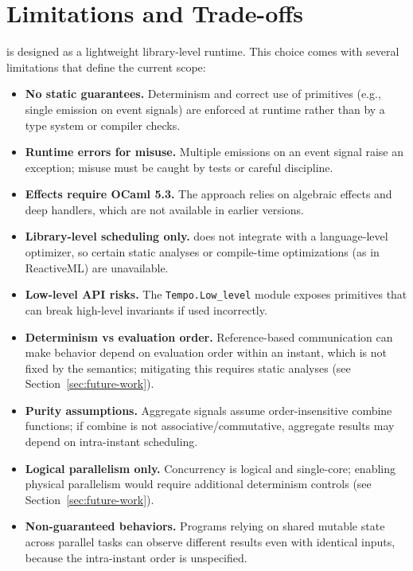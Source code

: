 \section{Limitations and Trade-offs}
\tempo{} is designed as a lightweight library-level runtime. This choice comes
with several limitations that define the current scope:
\begin{itemize}
\item \textbf{No static guarantees.} Determinism and correct use of primitives
  (e.g., single emission on event signals) are enforced at runtime rather than
  by a type system or compiler checks.
\item \textbf{Runtime errors for misuse.} Multiple emissions on an event signal
  raise an exception; misuse must be caught by tests or careful discipline.
\item \textbf{Effects require OCaml 5.3.} The approach relies on algebraic
  effects and deep handlers, which are not available in earlier versions.
\item \textbf{Library-level scheduling only.} \tempo{} does not integrate with a
  language-level optimizer, so certain static analyses or compile-time
  optimizations (as in ReactiveML) are unavailable.
\item \textbf{Low-level API risks.} The \texttt{Tempo.Low\_level} module exposes
  primitives that can break high-level invariants if used incorrectly.
\item \textbf{Determinism vs evaluation order.} Reference-based communication
  can make behavior depend on evaluation order within an instant, which is not
  fixed by the semantics; mitigating this requires static analyses (see
  Section~\ref{sec:future-work}).
\item \textbf{Purity assumptions.} Aggregate signals assume order-insensitive
  combine functions; if combine is not associative/commutative, aggregate
  results may depend on intra-instant scheduling.
\item \textbf{Logical parallelism only.} Concurrency is logical and single-core;
  enabling physical parallelism would require additional determinism controls
  (see Section~\ref{sec:future-work}).
\item \textbf{Non-guaranteed behaviors.} Programs relying on shared mutable
  state across parallel tasks can observe different results even with identical
  inputs, because the intra-instant order is unspecified.
\end{itemize}
